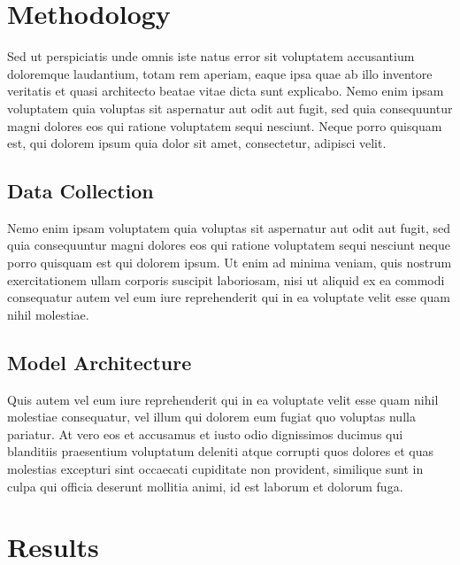 \section{Methodology}

Sed ut perspiciatis unde omnis iste natus error sit voluptatem
accusantium doloremque laudantium, totam rem aperiam, eaque ipsa quae
ab illo inventore veritatis et quasi architecto beatae vitae dicta sunt
explicabo. Nemo enim ipsam voluptatem quia voluptas sit aspernatur aut
odit aut fugit, sed quia consequuntur magni dolores eos qui ratione
voluptatem sequi nesciunt. Neque porro quisquam est, qui dolorem ipsum
quia dolor sit amet, consectetur, adipisci velit.

\subsection{Data Collection}

Nemo enim ipsam voluptatem quia voluptas sit aspernatur aut odit aut
fugit, sed quia consequuntur magni dolores eos qui ratione voluptatem
sequi nesciunt neque porro quisquam est qui dolorem ipsum. Ut enim ad
minima veniam, quis nostrum exercitationem ullam corporis suscipit
laboriosam, nisi ut aliquid ex ea commodi consequatur autem vel eum
iure reprehenderit qui in ea voluptate velit esse quam nihil molestiae.

\subsection{Model Architecture}

Quis autem vel eum iure reprehenderit qui in ea voluptate velit esse
quam nihil molestiae consequatur, vel illum qui dolorem eum fugiat quo
voluptas nulla pariatur. At vero eos et accusamus et iusto odio
dignissimos ducimus qui blanditiis praesentium voluptatum deleniti
atque corrupti quos dolores et quas molestias excepturi sint occaecati
cupiditate non provident, similique sunt in culpa qui officia deserunt
mollitia animi, id est laborum et dolorum fuga.

\section{Results}

